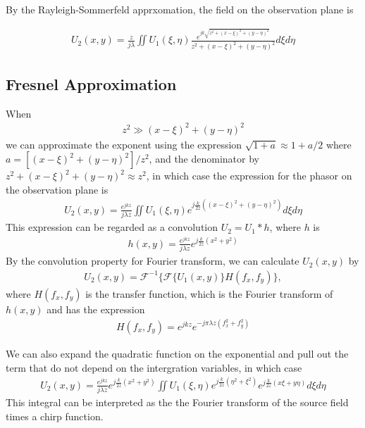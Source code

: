 \documentclass{article}
\begin{document}
By the Rayleigh-Sommerfeld apprxomation, the field on the observation plane is

\begin{align}
    U_2(x, y) = \frac{z}{j\lambda} \iint U_1(\xi, \eta) \frac{e^{jk\sqrt{z^2 + (x-\xi)^2 + (y-\eta)^2}}}
    {z^2 + (x-\xi)^2 + (y-\eta)^2} d\xi d\eta
\end{align}

\subsection{Fresnel Approximation}

When
\begin{align}
    z^2 \gg (x-\xi)^2 + (y-\eta)^2
\end{align}
we can approximate the exponent using the expression $\sqrt{1 + a} \approx 1 + a/2$ where 
$a = [(x-\xi)^2 + (y-\eta)^2]/z^2$, and the denominator by $z^2 + (x-\xi)^2 + (y-\eta)^2 \approx z^2$, 
in which case the expression for the phasor on the observation plane is
\begin{align}
    U_2(x, y) = \frac{e^{jkz}}{j\lambda z} \iint U_1(\xi,\eta) e^{j\frac{k}{2z}((x-\xi)^2 + (y-\eta)^2)} d\xi d\eta
\end{align}
This expression can be regarded as a convolution $U_2 = U_1 * h$, where $h$ is
\begin{align}
    h(x, y) = \frac{e^{jkz}}{j\lambda z} e^{j\frac{k}{2z}(x^2 + y^2)}
\end{align}
By the convolution property for Fourier transform, we can calculate $U_2(x, y)$ by
\begin{align}
    U_2(x, y) = \mathcal{F}^{-1}\{ \mathcal{F}\{U_1(x, y)\} H(f_x, f_y) \},
\end{align}
where $H(f_x, f_y)$ is the transfer function, which is the Fourier transform of $h(x, y)$ and has the expression
\begin{align}
    H(f_x, f_y) = e^{jkz} e^{-j\pi\lambda z(f_x^2 + f_y^2)}
\end{align}

We can also expand the quadratic function on the exponential and pull out the term that do not depend on the intergration variables, in which case
\begin{align}
    U_2(x, y) = \frac{e^{jkz}}{j\lambda z} e^{j\frac{k}{2z}(x^2+y^2)} \iint U_1(\xi,\eta) e^{j\frac{k}{2z}(\eta^2+\xi^2)} e^{j\frac{k}{2z}(x\xi + y\eta)} d\xi d\eta
\end{align}
This integral can be interpreted as the the Fourier transform of the source field times a chirp function.
\end{document}
